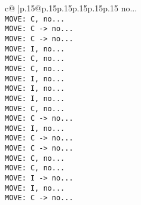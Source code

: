 \documentclass{article}
\begin{document}
{\begin{supertabular}{c@{$\;$}|p{.15\linewidth}@{}p{.15\linewidth}p{.15\linewidth}p{.15\linewidth}p{.15\linewidth}p{.15\linewidth}}
{{{ no...\\ \tt  MOVE: C, no...\\ \tt  MOVE: C -> no...\\ \tt  MOVE: C -> no...\\ \tt  MOVE: I, no...\\ \tt  MOVE: C, no...\\ \tt  MOVE: C, no...\\ \tt  MOVE: I, no...\\ \tt  MOVE: I, no...\\ \tt  MOVE: I, no...\\ \tt  MOVE: C, no...\\ \tt  MOVE: C -> no...\\ \tt  MOVE: I, no...\\ \tt  MOVE: C -> no...\\ \tt  MOVE: C -> no...\\ \tt  MOVE: C, no...\\ \tt  MOVE: C, no...\\ \tt  MOVE: I -> no...\\ \tt  MOVE: I, no...\\ \tt  MOVE: C -> no...\\ }}}
\end{supertabular}}
\end{document}
